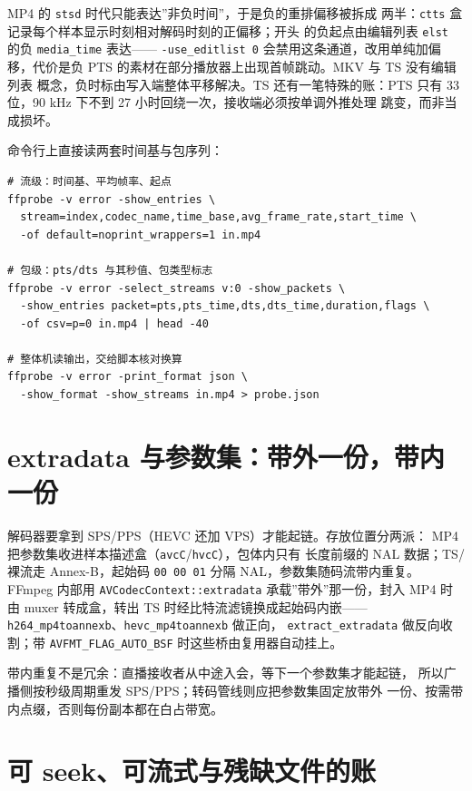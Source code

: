 \documentclass[12pt,a4paper,fontset=fandol]{ctexbook}
\newcommand{\Tp}[1]{\texttt{#1}}
\newcommand{\Bk}{\discretionary{}{}{}}
\begin{document}
MP4 的 \Tp{stsd} 时代只能表达''非负时间''，于是负的重排偏移被拆成
两半：\Tp{ctts} 盒记录每个样本显示时刻相对解码时刻的正偏移；开头
的负起点由编辑列表 \Tp{elst} 的负 \Tp{media\_time} 表达——
\Tp{-use\_editlist 0} 会禁用这条通道，改用单纯加偏移，代价是负
PTS 的素材在部分播放器上出现首帧跳动。MKV 与 TS 没有编辑列表
概念，负时标由写入端整体平移解决。TS 还有一笔特殊的账：PTS 只有
33 位，90 kHz 下不到 27 小时回绕一次，接收端必须按单调外推处理
跳变，而非当成损坏。

命令行上直接读两套时间基与包序列：

\begin{lstlisting}[style=shellstyle,
  caption={ffprobe 读流级 time\_base 与包级 pts/dts},
  label={lst:ch10-ffprobe}]
# 流级：时间基、平均帧率、起点
ffprobe -v error -show_entries \
  stream=index,codec_name,time_base,avg_frame_rate,start_time \
  -of default=noprint_wrappers=1 in.mp4

# 包级：pts/dts 与其秒值、包类型标志
ffprobe -v error -select_streams v:0 -show_packets \
  -show_entries packet=pts,pts_time,dts,dts_time,duration,flags \
  -of csv=p=0 in.mp4 | head -40

# 整体机读输出，交给脚本核对换算
ffprobe -v error -print_format json \
  -show_format -show_streams in.mp4 > probe.json
\end{lstlisting}

\section{extradata 与参数集：带外一份，带内一份}

解码器要拿到 SPS/PPS（HEVC 还加 VPS）才能起链。存放位置分两派：
MP4 把参数集收进样本描述盒（\Tp{avcC}/{\Bk}\Tp{hvcC}），包体内只有
长度前缀的 NAL 数据；TS/裸流走 Annex-B，起始码 \Tp{00 00 01} 分隔
NAL，参数集随码流带内重复。FFmpeg 内部用
\Tp{AVCodecContext::extradata} 承载''带外''那一份，封入 MP4 时由
muxer 转成盒，转出 TS 时经比特流滤镜换成起始码内嵌——
\Tp{h264\_mp4toannexb}、\Tp{hevc\_mp4toannexb} 做正向，
\Tp{extract\_extradata} 做反向收割；带 \Tp{AVFMT\_FLAG\_AUTO\_BSF}
时这些桥由复用器自动挂上。

带内重复不是冗余：直播接收者从中途入会，等下一个参数集才能起链，
所以广播侧按秒级周期重发 SPS/PPS；转码管线则应把参数集固定放带外
一份、按需带内点缀，否则每份副本都在白占带宽。

\section{可 seek、可流式与残缺文件的账}
\end{document}
